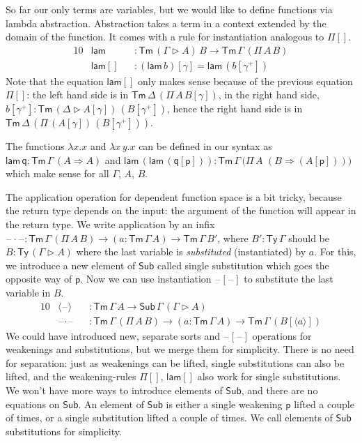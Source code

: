 \documentclass[sigplan,10pt,anonymous,review]{acmart}\settopmatter{printfolios=true,printccs=false,printacmref=false}
\newcommand{\ra}{\rightarrow}
\newcommand{\Ra}{\Rightarrow}
\newcommand{\Ty}{\mathsf{Ty}}
\newcommand{\Tm}{\mathsf{Tm}}
\newcommand{\Sub}{\mathsf{Sub}}
\newcommand{\p}{\mathsf{p}}
\newcommand{\q}{\mathsf{q}}
\newcommand{\ext}{\mathop{\triangleright}}
\newcommand{\lam}{\mathsf{lam}}
\newcommand{\blank}{\mathord{\hspace{1pt}\text{--}\hspace{1pt}}} %
\begin{document}
So far our only terms are variables, but we would like to define
functions via lambda abstraction. Abstraction takes a term in a
context extended by the domain of the function. It comes with a rule
for instantiation analogous to $\Pi[]$.
\begin{alignat*}{10}
& \lam && : \Tm\,(\Gamma\ext A)\,B\ra\Tm\,\Gamma\,(\Pi\,A\,B) \\
& \lam[] && : (\lam\,b)[\gamma] = \lam\,(b[\gamma^+])
\end{alignat*}
Note that the equation $\lam[]$ only makes sense because of the
previous equation $\Pi[]$: the left hand side is in
$\Tm\,\Delta\,(\Pi\,A\,B[\gamma])$, in the right hand side,
$b[\gamma^+] : \Tm\,(\Delta\ext A[\gamma])\,(B[\gamma^+])$, hence the
right hand side is in
$\Tm\,\Delta\,(\Pi\,(A[\gamma])\,(B[\gamma^+]))$.

The functions $\lambda x.x$ and $\lambda x\,y.x$ can be defined in our
syntax as $\lam\,\q : \Tm\,\Gamma\,(A\Ra A)$ and
$\lam\,(\lam\,(\q[\p])) :
\Tm\,\Gamma\,\big(\Pi\,A$ $(B\Ra(A[\p]))\big)$ which make sense for all
$\Gamma$, $A$, $B$.

The application operation for dependent function space is a bit
tricky, because the return type depends on the input: the argument of
the function will appear in the return type. We write application by
an infix $\blank\cdot\blank :
\Tm\,\Gamma\,(\Pi\,A\,B)\ra(a:\Tm\,\Gamma\,A)\ra\Tm\,\Gamma\,B'$,
where $B' : \Ty\,\Gamma$ should be $B:\Ty\,(\Gamma\ext A)$ where the
last variable is \emph{substituted} (instantiated) by $a$. For this,
we introduce a new element of $\Sub$ called single substitution which
goes the opposite way of $\p$. Now we can use instantiation
$\blank[\blank]$ to substitute the last variable in $B$.
\begin{alignat*}{10}
& \langle\blank\rangle && : \Tm\,\Gamma\,A\ra\Sub\,\Gamma\,(\Gamma\ext A) \\
& \blank\cdot\blank && : \Tm\,\Gamma\,(\Pi\,A\,B)\ra(a:\Tm\,\Gamma\,A)\ra\Tm\,\Gamma\,(B[\langle a\rangle])
\end{alignat*}
We could have introduced new, separate sorts and $\blank[\blank]$
operations for weakenings and substitutions, but we merge them for
simplicity. There is no need for separation: just as weakenings can be
lifted, single substitutions can also be lifted, and the
weakening-rules $\Pi[]$, $\lam[]$ also work for single
substitutions. We won't have more ways to introduce elements of
$\Sub$, and there are no equations on $\Sub$. An element of $\Sub$ is
either a single weakening $\p$ lifted a couple of times, or a single
substitution lifted a couple of times. We call elements of $\Sub$
substitutions for simplicity.
\end{document}
